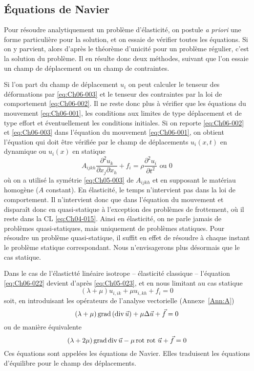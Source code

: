 \subsection{Équations de Navier}
Pour résoudre analytiquement un problème d'élasticité, on postule \textit{a priori} une forme particulière pour la solution, et on essaie de vérifier toutes les équations.
Si on y parvient, alors d'après le théorème d'unicité pour un problème régulier, c'est la solution du problème.
Il en résulte donc deux méthodes, suivant que l'on essaie un champ de déplacement ou un champ de contraintes.

Si l'on part du champ de déplacement $u_i$ on peut calculer le tenseur des déformations par \eqref{eq:Ch06-003} et le tenseur des contraintes par la loi de comportement \eqref{eq:Ch06-002}.
Il ne reste donc plus à vérifier que les équations du mouvement \eqref{eq:Ch06-001}, les conditions aux limites de type déplacement et de type effort et éventuellement les conditions initiales.
Si on reporte \eqref{eq:Ch06-002} et \eqref{eq:Ch06-003} dans l'équation du mouvement \eqref{eq:Ch06-001}, on obtient l'équation qui doit être vérifiée par le champ de déplacements $u_i\left( x,t \right)$ en dynamique ou $u_i(x)$ en statique
\begin{equation}
    A_{ijkh} \frac{\partial^2 u_k}{\partial x_j \partial x_h} + f_i = \rho \frac{\partial^2 u_i}{\partial t^2} \text{ ou } 0
    \label{eq:Ch06-022}
\end{equation}
où on a utilisé la symétrie \eqref{eq:Ch05-003} de $A_{ijkh}$ et en supposant le matériau homogène ($A$ constant).
En élasticité, le temps n'intervient pas dans la loi de comportement.
Il n'intervient donc que dans l'équation du mouvement et disparaît donc en quasi-statique à l'exception des problèmes de frottement, où il reste dans la CL \eqref{eq:Ch04-015}.
Ainsi en élasticité, on ne parle jamais de problèmes quasi-statiques, mais uniquement de problèmes statiques.
Pour résoudre un problème quasi-statique, il suffit en effet de résoudre à chaque instant le problème statique correspondant.
Nous n'envisagerons plus désormais que le cas statique.

Dans le cas de l'élastictté linéaire isotrope -- élasticité classique -- l'équation \eqref{eq:Ch06-022} devient d'après \eqref{eq:Ch05-023}, et en nous limitant au cas statique
\begin{equation}
    \left( \lambda + \mu \right) u_{i,ik} + \mu u_{i,kh} + f_i = 0
    \label{eq:Ch06-023}
\end{equation}
soit, en introduisant les opérateurs de l'analyse vectorielle (Annexe~\ref{Ann:A})
\begin{equation}
    \left( \lambda + \mu \right) \operatorname*{\mathrm{grad}} \left( \operatorname*{\mathrm{div}} \vec{u} \right) + \mu \Delta \vec{u} + \vec{f} = 0
    \label{eq:Ch06-024}
\end{equation}
ou de manière équivalente
\begin{equation}
    \left( \lambda + 2\mu \right) \operatorname*{\mathrm{grad}} \operatorname*{\mathrm{div}} \vec{u} - \mu \operatorname*{\mathrm{rot}\,} \operatorname*{\mathrm{rot}\,} \vec{u} + \vec{f} = 0
    \label{eq:Ch06-025}
\end{equation}
Ces équations sont appelées les équations de Navier.
Elles traduisent les équations d'équilibre pour le champ des déplacements.

